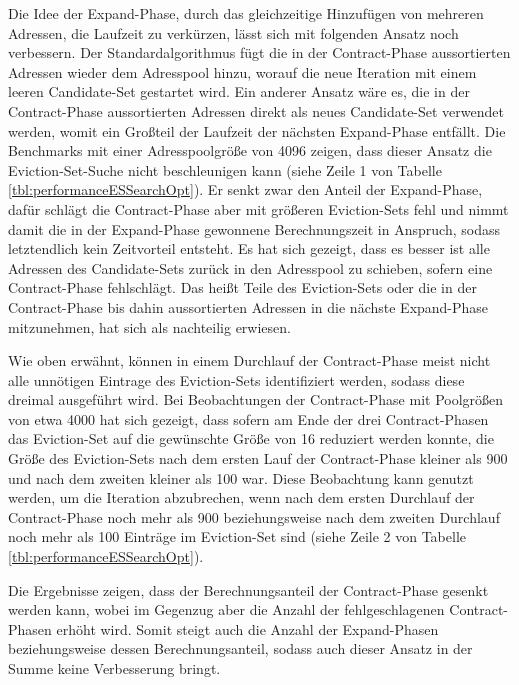 Die Idee der Expand-Phase, durch das gleichzeitige Hinzufügen von mehreren Adressen, die Laufzeit zu verkürzen, lässt sich mit folgenden Ansatz noch verbessern.
Der Standardalgorithmus fügt die in der Contract-Phase aussortierten Adressen wieder dem Adresspool hinzu, worauf die neue Iteration mit einem leeren Candidate-Set gestartet wird.
Ein anderer Ansatz wäre es, die in der Contract-Phase aussortierten Adressen direkt als neues Candidate-Set verwendet werden, womit ein Großteil der Laufzeit der nächsten Expand-Phase entfällt.
Die Benchmarks mit einer Adresspoolgröße von 4096 zeigen, dass dieser Ansatz die Eviction-Set-Suche nicht beschleunigen kann (siehe Zeile 1 von Tabelle \ref{tbl:performanceESSearchOpt}).
Er senkt zwar den Anteil der Expand-Phase, dafür schlägt die Contract-Phase aber mit größeren Eviction-Sets fehl und nimmt damit die in der Expand-Phase gewonnene Berechnungszeit in Anspruch, sodass letztendlich kein Zeitvorteil entsteht.
Es hat sich gezeigt, dass es besser ist alle Adressen des Candidate-Sets zurück in den Adresspool zu schieben, sofern eine Contract-Phase fehlschlägt.
Das heißt Teile des Eviction-Sets oder die in der Contract-Phase bis dahin aussortierten Adressen in die nächste Expand-Phase mitzunehmen, hat sich als nachteilig erwiesen.


Wie oben erwähnt, können in einem Durchlauf der Contract-Phase meist nicht alle unnötigen Eintrage des Eviction-Sets identifiziert werden, sodass diese dreimal ausgeführt wird.
Bei Beobachtungen der Contract-Phase mit Poolgrößen von etwa 4000 hat sich gezeigt, dass sofern am Ende der drei Contract-Phasen das Eviction-Set auf die gewünschte Größe von 16 reduziert werden konnte, die Größe des Eviction-Sets nach dem ersten Lauf der Contract-Phase kleiner als 900 und nach dem zweiten kleiner als 100 war.
Diese Beobachtung kann genutzt werden, um die Iteration abzubrechen, wenn nach dem ersten Durchlauf der Contract-Phase noch mehr als 900 beziehungsweise nach dem zweiten Durchlauf noch mehr als 100 Einträge im Eviction-Set sind (siehe Zeile 2 von Tabelle \ref{tbl:performanceESSearchOpt}).

Die Ergebnisse zeigen, dass der Berechnungsanteil der Contract-Phase gesenkt werden kann, wobei im Gegenzug aber die Anzahl der fehlgeschlagenen Contract-Phasen erhöht wird.
Somit steigt auch die Anzahl der Expand-Phasen beziehungsweise dessen Berechnungsanteil, sodass auch dieser Ansatz in der Summe keine Verbesserung bringt.

